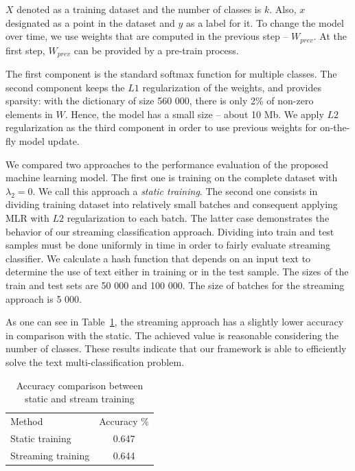 $X$ denoted as a training dataset and the number of classes is $k$. Also, $x$ designated as a point in the dataset and $y$ as a label for it. To change the model over time, we use weights that are computed in the previous step -- $W_{prev}$. At the first step, $W_{prev}$ can be provided by a pre-train process.

The first component is the standard softmax function for multiple classes. The second component keeps the $L1$ regularization of the weights, and provides sparsity: with the dictionary of size 560 000, there is only 2\% of non-zero elements in $W$. Hence, the model has a small size -- about 10 Mb. We apply $L2$ regularization as the third component in order to use previous weights for on-the-fly model update.

We compared two approaches to the performance evaluation of the proposed machine learning model. The first one is training on the complete dataset with $\lambda_2 = 0$. We call this approach a {\em static training}. The second one consists in dividing training dataset into relatively small batches and consequent applying MLR with $L2$ regularization to each batch. The latter case demonstrates the behavior of our streaming classification approach. Dividing into train and test samples must be done uniformly in time in order to fairly evaluate streaming classifier. We calculate a hash function that depends on an input text to determine the use of text either in training or in the test sample. The sizes of the train and test sets are 50 000 and 100 000. The size of batches for the streaming approach is 5 000.

As one can see in Table~\ref{accuracy}, the streaming approach has a slightly lower accuracy in comparison with the static. The achieved value is reasonable considering the number of classes. These results indicate that our framework is able to efficiently solve the text multi-classification problem.

\begin{table}[htbp]
\begin{tabular}{lc}
Method             & Accuracy \% \\
Static training    & 0.647       \\
Streaming training & 0.644         
\end{tabular}
\caption{Accuracy comparison between static and stream training}
\label{accuracy}
\vspace{-7mm}
\end{table}